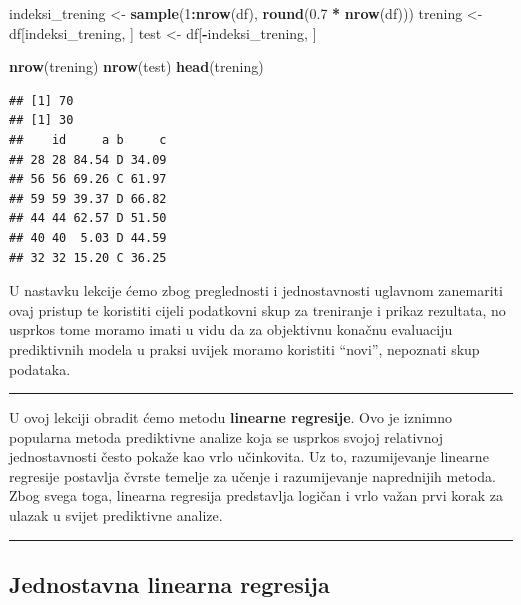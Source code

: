 \documentclass[]{book}
\newenvironment{Shaded}{\begin{snugshade}}{\end{snugshade}}
\newcommand{\KeywordTok}[1]{\textcolor[rgb]{0.13,0.29,0.53}{\textbf{#1}}}
\newcommand{\DecValTok}[1]{\textcolor[rgb]{0.00,0.00,0.81}{#1}}
\newcommand{\FloatTok}[1]{\textcolor[rgb]{0.00,0.00,0.81}{#1}}
\newcommand{\StringTok}[1]{\textcolor[rgb]{0.31,0.60,0.02}{#1}}
\newcommand{\OperatorTok}[1]{\textcolor[rgb]{0.81,0.36,0.00}{\textbf{#1}}}
\newcommand{\NormalTok}[1]{#1}
\theoremstyle{definition}
\theoremstyle{definition}
\theoremstyle{definition}
\theoremstyle{remark}
\begin{document}
\begin{Shaded}
\begin{Highlighting}[]
\NormalTok{indeksi_trening <-}\StringTok{ }\KeywordTok{sample}\NormalTok{(}\DecValTok{1}\OperatorTok{:}\KeywordTok{nrow}\NormalTok{(df), }\KeywordTok{round}\NormalTok{(}\FloatTok{0.7} \OperatorTok{*}\StringTok{ }\KeywordTok{nrow}\NormalTok{(df)))}
\NormalTok{trening <-}\StringTok{ }\NormalTok{df[indeksi_trening, ]}
\NormalTok{test <-}\StringTok{ }\NormalTok{df[}\OperatorTok{-}\NormalTok{indeksi_trening, ]}

\KeywordTok{nrow}\NormalTok{(trening)}
\KeywordTok{nrow}\NormalTok{(test)}
\KeywordTok{head}\NormalTok{(trening)}
\end{Highlighting}
\end{Shaded}

\begin{verbatim}
## [1] 70
## [1] 30
##    id     a b     c
## 28 28 84.54 D 34.09
## 56 56 69.26 C 61.97
## 59 59 39.37 D 66.82
## 44 44 62.57 D 51.50
## 40 40  5.03 D 44.59
## 32 32 15.20 C 36.25
\end{verbatim}

U nastavku lekcije ćemo zbog preglednosti i jednostavnosti uglavnom
zanemariti ovaj pristup te koristiti cijeli podatkovni skup za
treniranje i prikaz rezultata, no usprkos tome moramo imati u vidu da za
objektivnu konačnu evaluaciju prediktivnih modela u praksi uvijek moramo
koristiti ``novi'', nepoznati skup podataka.

\begin{center}\rule{0.5\linewidth}{\linethickness}\end{center}

U ovoj lekciji obradit ćemo metodu \textbf{linearne regresije}. Ovo je
iznimno popularna metoda prediktivne analize koja se usprkos svojoj
relativnoj jednostavnosti često pokaže kao vrlo učinkovita. Uz to,
razumijevanje linearne regresije postavlja čvrste temelje za učenje i
razumijevanje naprednijih metoda. Zbog svega toga, linearna regresija
predstavlja logičan i vrlo važan prvi korak za ulazak u svijet
prediktivne analize.

\begin{center}\rule{0.5\linewidth}{\linethickness}\end{center}

\subsection{Jednostavna linearna
regresija}\label{jednostavna-linearna-regresija}
\end{document}
